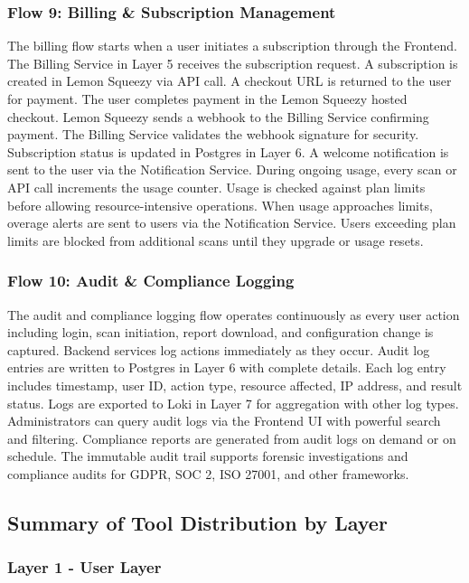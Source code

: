 \documentclass[12pt,a4paper]{report}
\begin{document}
\subsubsection{Flow 9: Billing \& Subscription Management}

The billing flow starts when a user initiates a subscription through the Frontend. The Billing Service in Layer 5 receives the subscription request. A subscription is created in Lemon Squeezy via API call. A checkout URL is returned to the user for payment. The user completes payment in the Lemon Squeezy hosted checkout. Lemon Squeezy sends a webhook to the Billing Service confirming payment. The Billing Service validates the webhook signature for security. Subscription status is updated in Postgres in Layer 6. A welcome notification is sent to the user via the Notification Service. During ongoing usage, every scan or API call increments the usage counter. Usage is checked against plan limits before allowing resource-intensive operations. When usage approaches limits, overage alerts are sent to users via the Notification Service. Users exceeding plan limits are blocked from additional scans until they upgrade or usage resets.

\subsubsection{Flow 10: Audit \& Compliance Logging}

The audit and compliance logging flow operates continuously as every user action including login, scan initiation, report download, and configuration change is captured. Backend services log actions immediately as they occur. Audit log entries are written to Postgres in Layer 6 with complete details. Each log entry includes timestamp, user ID, action type, resource affected, IP address, and result status. Logs are exported to Loki in Layer 7 for aggregation with other log types. Administrators can query audit logs via the Frontend UI with powerful search and filtering. Compliance reports are generated from audit logs on demand or on schedule. The immutable audit trail supports forensic investigations and compliance audits for GDPR, SOC 2, ISO 27001, and other frameworks.

\subsection{Summary of Tool Distribution by Layer}

\subsubsection{Layer 1 - User Layer}
\end{document}
